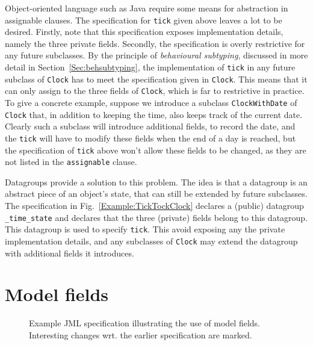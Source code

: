 \documentclass{llncs}
\begin{document}
Object-oriented language such as Java require some means for abstraction in 
assignable clauses.
The specification for \texttt{tick} given above leaves a lot to be desired.
Firstly, note that this specification exposes implementation details,
namely the three private fields.
Secondly, the specification is overly restrictive for any future subclasses.
By the principle of \emph{behavioural subtyping}, discussed in more detail
in Section~\ref{Sec:behsubtyping}, the implementation of \texttt{tick} in any future
subclass of \texttt{Clock} has to meet the specification given in \texttt{Clock}.
This means that it can only assign to the three fields of \texttt{Clock},
which is far to restrictive in practice.
To give a concrete example, suppose we introduce a subclass \texttt{ClockWithDate} 
of \texttt{Clock} that, in addition to keeping the time, also keeps track of the 
current date.  Clearly such a subclass will introduce additional fields, to record 
the date, and the \texttt{tick} will have to modify these fields when the end
of a day is reached,  but the specification of \texttt{tick} above won't allow 
these fields to be changed, as they are not listed in the \texttt{assignable} clause.

Datagroups \cite{Leino98} provide a solution to 
this problem. The idea is that a datagroup is an abstract piece of an object's
state, that can still be extended by future subclasses.
The specification in Fig.~\ref{Example:TickTockClock} declares a (public) datagroup
\texttt{\_time\_state} and declares that the three (private) fields belong
to this datagroup. This datagroup is used to specify \texttt{tick}.
This avoid exposing any the private implementation details, and
any subclasses of \texttt{Clock} may extend the datagroup with
additional fields it introduces.


\section{Model fields}
\label{Sec:model}


\begin{figure}[tbp] \label{Example:model}
%

%
\vspace*{-2ex} %
\caption{Example JML specification illustrating the use of model fields. Interesting changes wrt. the earlier specification are marked.}
\end{figure}
\end{document}
